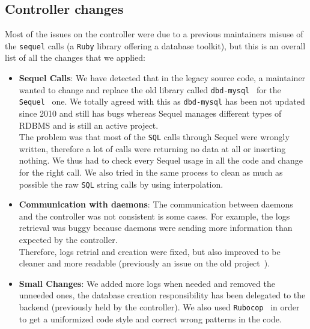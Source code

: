 \documentclass{eplmastersthesis}
\begin{document}
      \subsection{Controller changes}

        Most of the issues on the controller were due to a previous
        maintainers misuse of the \texttt{sequel} calls (a \texttt{Ruby} library offering a database
        toolkit), but this is an overall list of all the changes that we
        applied:

        \begin{itemize}
          \item \textbf{Sequel Calls}: We have detected that in the legacy
          source code, a maintainer wanted to change and replace the old library
          called \texttt{dbd-mysql}~\cite{dbdMysql} for the \texttt{Sequel}~\cite{Sequel} one. We
          totally agreed with this as \texttt{dbd-mysql} has been not updated since
          2010 and still has bugs whereas Sequel manages different types of
          RDBMS and is still an active project.\\
          The problem was that most of the \texttt{SQL} calls through Sequel were wrongly
          written, therefore a lot of calls were returning no data at all or
          inserting nothing. We thus had to check every Sequel usage in all the
          code and change for the right call. We also tried in the same process
          to clean as much as possible the raw \texttt{SQL} string calls by using
          interpolation.
          \item \textbf{Communication with daemons}: The communication between daemons
          and the controller was not consistent is some cases. For example, the
          logs retrieval was buggy because daemons were sending more
          information than expected by the controller.\\
          Therefore, logs retrial and creation were fixed, but
          also improved to be cleaner and more readable (previously an issue on
          the old project~\cite{logTimestamps}).
          \item \textbf{Small Changes}: We added more logs when needed and
          removed the unneeded ones, the database creation responsibility has
          been delegated to the backend (previously held by the controller). We
          also used \texttt{Rubocop}~\cite{Rubocop} in order to get a uniformized code
          style and correct wrong patterns in the code.
        \end{itemize}
\end{document}
